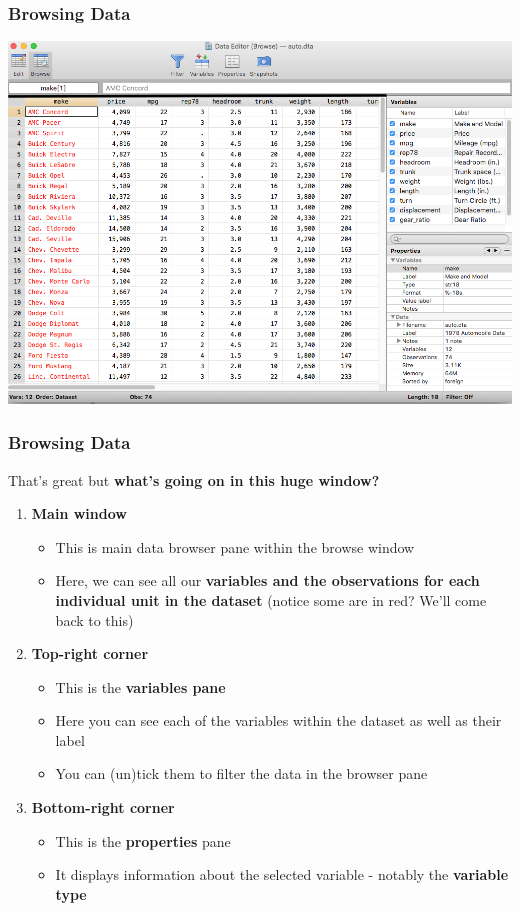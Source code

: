 \documentclass[10pt, compress]{beamer}
\begin{document}
\begin{frame}[fragile]
\frametitle{Browsing Data}
\includegraphics[width=\linewidth,height=\textheight,keepaspectratio]{browse.png}
\end{frame}

\begin{frame}[fragile]
\frametitle{Browsing Data}
That's great but \textbf{what's going on in this huge window?}
\begin{enumerate}
\item \textbf{Main window}
\begin{itemize}
	\item This is main data browser pane within the browse window
	\item Here, we can see all our \textbf{variables and the observations for each individual unit in the dataset} (\alert{notice some are in red? We'll come back to this})
\end{itemize}
\item \textbf{Top-right corner}
\begin{itemize}
	\item This is the \textbf{variables pane}
	\item Here you can see each of the variables within the dataset as well as their label
	\item You can (un)tick them to filter the data in the browser pane
\end{itemize}
\item \textbf{Bottom-right corner}
\begin{itemize}
	\item This is the \textbf{properties} pane
	\item It displays information about the selected variable - notably the \textbf{variable type}
\end{itemize}	
\end{enumerate}

\end{frame}
\end{document}
